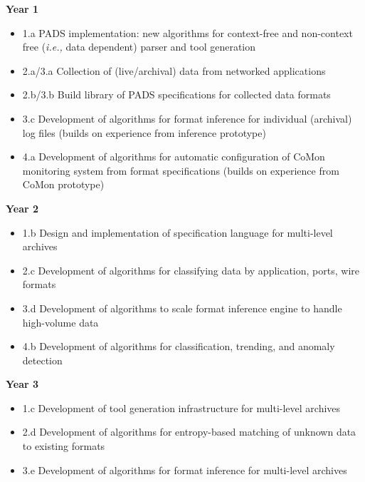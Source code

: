 

\noindent
{\bf Year 1}
\begin{itemize}
\item 1.a PADS implementation: new algorithms for context-free and non-context
free ({\em i.e.,} data dependent) parser and tool generation 
\item 2.a/3.a Collection of (live/archival) data from networked applications
\item 2.b/3.b Build library of PADS specifications for collected data formats
\item 3.c Development of algorithms for format inference for individual
(archival) log files
(builds on experience from inference prototype)
\item 4.a Development of algorithms for automatic configuration of CoMon monitoring system 
from format specifications (builds on experience from CoMon prototype)
\end{itemize}

\noindent
{\bf Year 2}
\begin{itemize}
\item 1.b Design and implementation of specification language for multi-level archives
\item 2.c Development of algorithms for classifying data by application, ports, wire formats
\item 3.d Development of algorithms to scale format inference engine to handle high-volume 
data
\item 4.b Development of algorithms for classification, trending, and 
anomaly detection
\end{itemize}

\noindent
{\bf Year 3}
\begin{itemize}
\item 1.c Development of tool generation infrastructure for multi-level archives
\item 2.d Development of algorithms for entropy-based matching of unknown data to existing formats
\item 3.e Development of algorithms for format inference for multi-level archives
\end{itemize}


